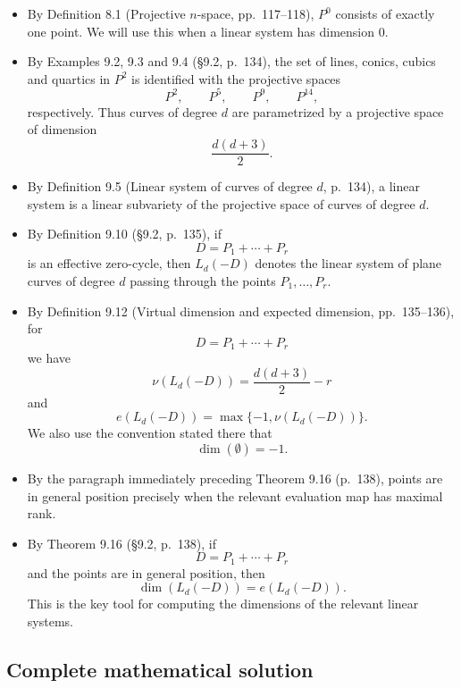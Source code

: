 \documentclass[a4paper,12pt,openany]{article}
\theoremstyle{plain}
\theoremstyle{definition}
\theoremstyle{remark}
\begin{document}
\begin{itemize}
    \item By Definition 8.1 (Projective $n$-space, pp.~117--118), $P^0$
    consists of exactly one point. We will use this when a linear system has
    dimension $0$.

    \item By Examples 9.2, 9.3 and 9.4 (\S9.2, p.~134), the set of lines,
    conics, cubics and quartics in $P^2$ is identified with the projective
    spaces
    \[
    P^2,\qquad P^5,\qquad P^9,\qquad P^{14},
    \]
    respectively. Thus curves of degree $d$ are parametrized by a
    projective space of dimension
    \[
    \frac{d(d+3)}{2}.
    \]

    \item By Definition 9.5 (Linear system of curves of degree $d$, p.~134),
    a linear system is a linear subvariety of the projective space of curves
    of degree $d$.

    \item By Definition 9.10 (\S9.2, p.~135), if
    \[
    D=P_1+\cdots+P_r
    \]
    is an effective zero-cycle, then $L_d(-D)$ denotes the linear system of
    plane curves of degree $d$ passing through the points
    $P_1,\dots,P_r$.

    \item By Definition 9.12 (Virtual dimension and expected dimension,
    pp.~135--136), for
    \[
    D=P_1+\cdots+P_r
    \]
    we have
    \[
    \nu(L_d(-D))=\frac{d(d+3)}{2}-r
    \]
    and
    \[
    e(L_d(-D))=\max\{-1,\nu(L_d(-D))\}.
    \]
    We also use the convention stated there that
    \[
    \dim(\emptyset)=-1.
    \]

    \item By the paragraph immediately preceding Theorem 9.16 (p.~138),
    points are in general position precisely when the relevant evaluation map
    has maximal rank.

    \item By Theorem 9.16 (\S9.2, p.~138), if
    \[
    D=P_1+\cdots+P_r
    \]
    and the points are in general position, then
    \[
    \dim(L_d(-D))=e(L_d(-D)).
    \]
    This is the key tool for computing the dimensions of the relevant
    linear systems.
\end{itemize}

\subsection*{Complete mathematical solution}
\end{document}
